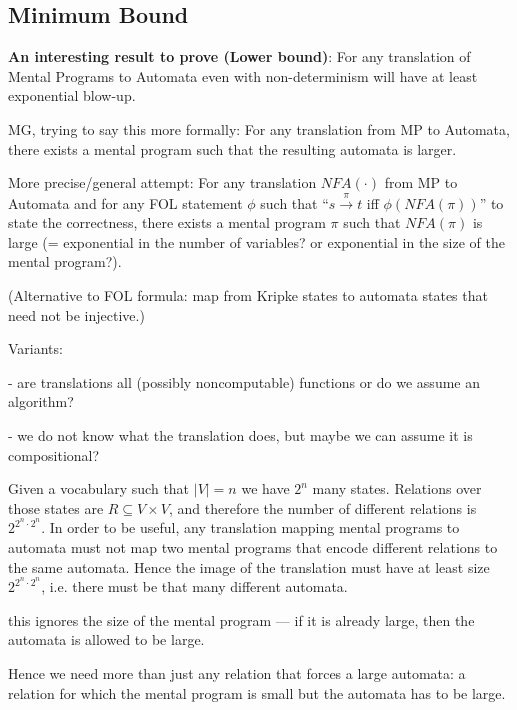 \subsection{Minimum Bound}

\textbf{An interesting result to prove (Lower bound)}: For any translation of Mental Programs to Automata even with non-determinism will have at least exponential blow-up.

MG, trying to say this more formally:
For any translation from MP to Automata, there exists a mental program such that the resulting automata is larger.

More precise/general attempt:
For any translation $NFA(\cdot)$ from MP to Automata and for any FOL statement $\phi$ such that ``$s \xrightarrow{\pi} t$ iff $\phi(NFA(\pi))$'' to state the correctness, there exists a mental program $\pi$ such that $NFA(\pi)$ is large (= exponential in the number of variables? or exponential in the size of the mental program?).

(Alternative to FOL formula: map from Kripke states to automata states that need not be injective.)

Variants:

- are translations all (possibly noncomputable) functions or do we assume an algorithm?

- we do not know what the translation does, but maybe we can assume it is compositional?

Given a vocabulary such that $|V| = n$ we have $2^n$ many states.
Relations over those states are $R \subseteq V \times V$, and therefore the number of different relations is $2^{2^n \cdot 2^n}$.
In order to be useful, any translation mapping mental programs to automata must not map two mental programs that encode different relations to the same automata.
Hence the image of the translation must have at least size $2^{2^n \cdot 2^n}$, i.e. there must be that many different automata.


\bigskip

 this ignores the size of the mental program --- if it is already large, then the automata is allowed to be large.

Hence we need more than just any relation that forces a large automata: a relation for which the mental program is small but the automata has to be large.

